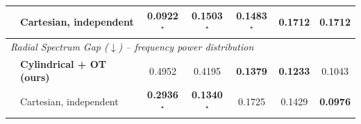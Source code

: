 \begin{table}[t]
{\begin{tabular}{llccccc}
        & Cartesian, independent           & \textbf{0.0922}$^\star$ & \textbf{0.1503}$^\star$ & \textbf{0.1483}$^\star$ & 0.1712 & 0.1712 \\
        \midrule
        \multicolumn{7}{l}{\textit{Radial Spectrum Gap ($\downarrow$) -- frequency power distribution}} \\
        & \textbf{Cylindrical + OT (ours)} & 0.4952 & 0.4195 & \textbf{0.1379} & \textbf{0.1233} & 0.1043 \\
        & Cartesian, independent           & \textbf{0.2936}$^\star$ & \textbf{0.1340}$^\star$ & 0.1725 & 0.1429 & \textbf{0.0976} \\
        \bottomrule
    \end{tabular}
    }
    \vspace{1mm}
\end{table}
